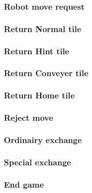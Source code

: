 	\subsubsection{Robot move request}
	

	\subsubsection{Return Normal tile}
	

	\subsubsection{Return Hint tile}
	

	\subsubsection{Return Conveyer tile}
	

	\subsubsection{Return Home tile}
	


	\subsubsection{Reject move}
	


	\subsubsection{Ordinairy exchange}
	
	
	\subsubsection{Special exchange}
	
	
	\subsubsection{End game}
	 

